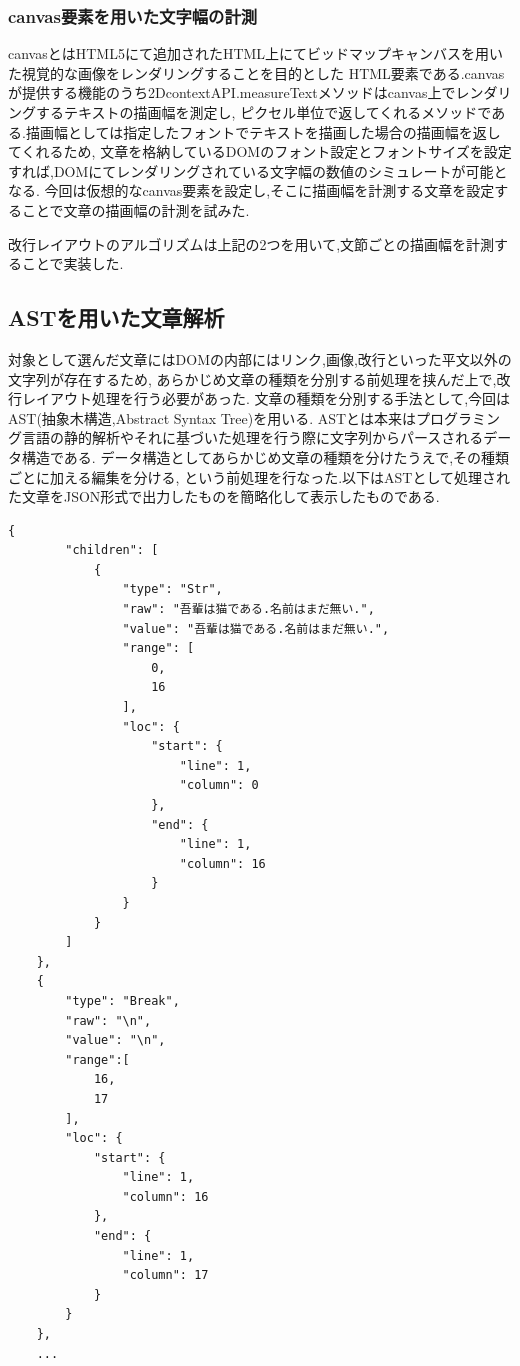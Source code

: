 \subsubsection{canvas要素を用いた文字幅の計測}
canvasとはHTML5にて追加されたHTML上にてビッドマップキャンバスを用いた視覚的な画像をレンダリングすることを目的とした
HTML要素である.canvasが提供する機能のうち2DcontextAPI.measureTextメソッドはcanvas上でレンダリングするテキストの描画幅を測定し,
ピクセル単位で返してくれるメソッドである.描画幅としては指定したフォントでテキストを描画した場合の描画幅を返してくれるため,
文章を格納しているDOMのフォント設定とフォントサイズを設定すれば,DOMにてレンダリングされている文字幅の数値のシミュレートが可能となる.
今回は仮想的なcanvas要素を設定し,そこに描画幅を計測する文章を設定することで文章の描画幅の計測を試みた.

改行レイアウトのアルゴリズムは上記の2つを用いて,文節ごとの描画幅を計測することで実装した.

\subsection{ASTを用いた文章解析}
対象として選んだ文章にはDOMの内部にはリンク,画像,改行といった平文以外の文字列が存在するため,
あらかじめ文章の種類を分別する前処理を挟んだ上で,改行レイアウト処理を行う必要があった.
文章の種類を分別する手法として,今回はAST(抽象木構造,Abstract Syntax Tree)を用いる.
ASTとは本来はプログラミング言語の静的解析やそれに基づいた処理を行う際に文字列からパースされるデータ構造である.
データ構造としてあらかじめ文章の種類を分けたうえで,その種類ごとに加える編集を分ける,
という前処理を行なった.以下はASTとして処理された文章をJSON形式で出力したものを簡略化して表示したものである.

\begin{lstlisting}[caption=textToAST.json]
    {
        "children": [
            {
                "type": "Str",
                "raw": "吾輩は猫である.名前はまだ無い.",
                "value": "吾輩は猫である.名前はまだ無い.",
                "range": [
                    0,
                    16
                ],
                "loc": {
                    "start": {
                        "line": 1,
                        "column": 0
                    },
                    "end": {
                        "line": 1,
                        "column": 16
                    }
                }
            }
        ]
    },
    {
        "type": "Break",
        "raw": "\n",
        "value": "\n",
        "range":[
            16,
            17
        ],
        "loc": {
            "start": {
                "line": 1,
                "column": 16
            },
            "end": {
                "line": 1,
                "column": 17
            }
        }
    },
    ...
\end{lstlisting}

